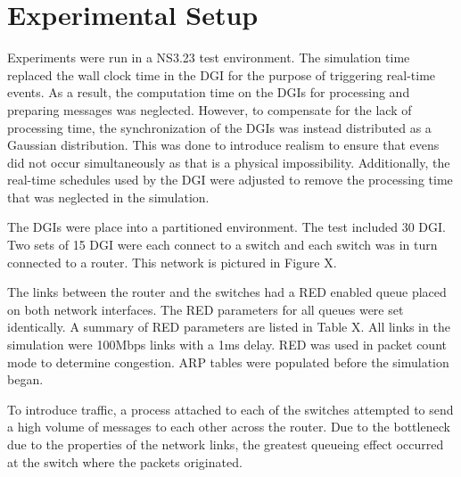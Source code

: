
\section{Experimental Setup}

Experiments were run in a NS3.23 test environment.
The simulation time replaced the wall clock time in the DGI for the purpose of triggering real-time events.
As a result, the computation time on the DGIs for processing and preparing messages was neglected.
However, to compensate for the lack of processing time, the synchronization of the DGIs was instead distributed as a Gaussian distribution.
This was done to introduce realism to ensure that evens did not occur simultaneously as that is a physical impossibility.
Additionally, the real-time schedules used by the DGI were adjusted to remove the processing time that was neglected in the simulation.

The DGIs were place into a partitioned environment.
The test included 30 DGI.
Two sets of 15 DGI were each connect to a switch and each switch was in turn connected to a router.
This network is pictured in Figure X.

The links between the router and the switches had a RED enabled queue placed on both network interfaces.
The RED parameters for all queues were set identically.
A summary of RED parameters are listed in Table X.
All links in the simulation were 100Mbps links with a 1ms delay.
RED was used in packet count mode to determine congestion.
ARP tables were populated before the simulation began.

To introduce traffic, a process attached to each of the switches attempted to send a high volume of messages to each other across the router.
Due to the bottleneck due to the properties of the network links, the greatest queueing effect occurred at the switch where the packets originated.

